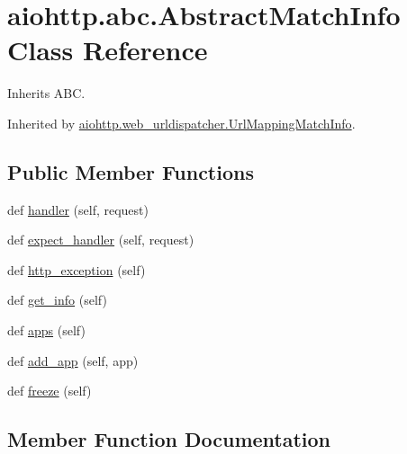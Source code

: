 \hypertarget{classaiohttp_1_1abc_1_1_abstract_match_info}{}\section{aiohttp.\+abc.\+Abstract\+Match\+Info Class Reference}
\label{classaiohttp_1_1abc_1_1_abstract_match_info}


Inherits A\+BC.



Inherited by \hyperlink{classaiohttp_1_1web__urldispatcher_1_1_url_mapping_match_info}{aiohttp.\+web\+\_\+urldispatcher.\+Url\+Mapping\+Match\+Info}.

\subsection*{Public Member Functions}
\begin{DoxyCompactItemize}
\item 
def \hyperlink{classaiohttp_1_1abc_1_1_abstract_match_info_a8d3796bc66efcfd82706a4f1cdcfceb6}{handler} (self, request)
\item 
def \hyperlink{classaiohttp_1_1abc_1_1_abstract_match_info_a3361b132ccb23e2c6c4016e368da4a3d}{expect\+\_\+handler} (self, request)
\item 
def \hyperlink{classaiohttp_1_1abc_1_1_abstract_match_info_a9b27b04d6696d44230149af3fd67c5a1}{http\+\_\+exception} (self)
\item 
def \hyperlink{classaiohttp_1_1abc_1_1_abstract_match_info_ae16c1f2ce6842e837aa05e1f73ba7b01}{get\+\_\+info} (self)
\item 
def \hyperlink{classaiohttp_1_1abc_1_1_abstract_match_info_aaef04591d8ebaf5eb23cdd3e81e96eae}{apps} (self)
\item 
def \hyperlink{classaiohttp_1_1abc_1_1_abstract_match_info_a1ce568a10ec8122596c0accc07181441}{add\+\_\+app} (self, app)
\item 
def \hyperlink{classaiohttp_1_1abc_1_1_abstract_match_info_a338f4d0997396d71c708f2c27a29d334}{freeze} (self)
\end{DoxyCompactItemize}


\subsection{Member Function Documentation}
\mbox{\label{classaiohttp_1_1abc_1_1_abstract_match_info_a1ce568a10ec8122596c0accc07181441}} 
